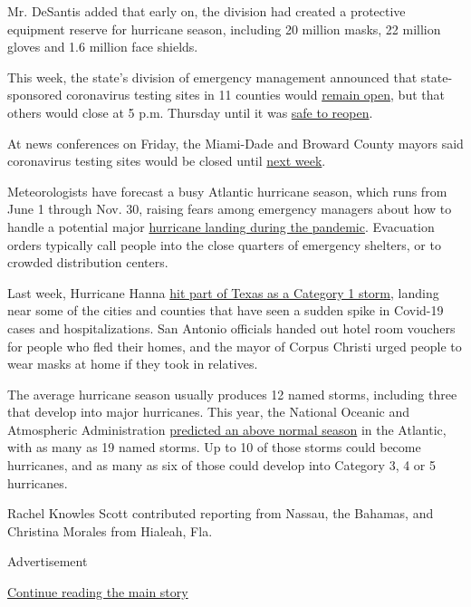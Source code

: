 Mr. DeSantis added that early on, the division had created a protective
equipment reserve for hurricane season, including 20 million masks, 22
million gloves and 1.6 million face shields.

This week, the state's division of emergency management announced that
state-sponsored coronavirus testing sites in 11 counties would
\href{https://twitter.com/FLSERT/status/1288974249194147840}{remain
open}, but that others would close at 5 p.m. Thursday until it was
\href{https://content.govdelivery.com/accounts/FLDEM/bulletins/297ef6d}{safe
to reopen}.

At news conferences on Friday, the Miami-Dade and Broward County mayors
said coronavirus testing sites would be closed until
\href{https://www.miamidade.gov/releases/2020-07-30-mayor-testing-closure.asp}{next
week}.

Meteorologists have forecast a busy Atlantic hurricane season, which
runs from June 1 through Nov. 30, raising fears among emergency managers
about how to handle a potential major
\href{https://www.nytimes.com/2020/05/24/us/hurricane-pandemic-coronavirus-florida.html}{hurricane
landing during the pandemic}. Evacuation orders typically call people
into the close quarters of emergency shelters, or to crowded
distribution centers.

Last week, Hurricane Hanna
\href{https://www.nytimes.com/2020/07/25/us/hanna-storm-texas.html}{hit
part of Texas as a Category 1 storm}, landing near some of the cities
and counties that have seen a sudden spike in Covid-19 cases and
hospitalizations. San Antonio officials handed out hotel room vouchers
for people who fled their homes, and the mayor of Corpus Christi urged
people to wear masks at home if they took in relatives.

The average hurricane season usually produces 12 named storms, including
three that develop into major hurricanes. This year, the National
Oceanic and Atmospheric Administration
\href{https://www.noaa.gov/media-release/busy-atlantic-hurricane-season-predicted-for-2020}{predicted
an above normal season} in the Atlantic, with as many as 19 named
storms. Up to 10 of those storms could become hurricanes, and as many as
six of those could develop into Category 3, 4 or 5 hurricanes.

Rachel Knowles Scott contributed reporting from Nassau, the Bahamas, and
Christina Morales from Hialeah, Fla.

Advertisement

\protect\hyperlink{after-bottom}{Continue reading the main story}

